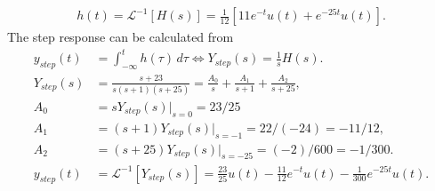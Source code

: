 \documentclass{report}
\begin{document}
\begin{solution}
\begin{align*}
        h(t) = \mathcal{L}^{-1}[H(s)] = \frac{1}{12}\left[11e^{-t}u(t) + e^{-25t}u(t)\right].
    \end{align*}
    The step response can be calculated from 
    \begin{align*}
        y_{step}(t) &= \int_{-\infty}^{t} h(\tau) \,d\tau \iff Y_{step}(s) = \frac{1}{s}H(s). \\[0.5cm]
        Y_{step}(s) &= \frac{s+23}{s(s+1)(s+25)} = \frac{A_0}{s} + \frac{A_1}{s+1} + \frac{A_2}{s+25}, \\
        A_0 &= sY_{step}(s)\big|_{s=0} = 23/25 \\
        A_1 &= (s+1)Y_{step}(s)\big|_{s=-1} = 22/(-24) = -11/12, \\
        A_2 &= (s+25)Y_{step}(s)\big|_{s=-25} = (-2)/600 = -1/300. \\[0.5cm]
        y_{step}(t) &= \mathcal{L}^{-1}[Y_{step}(s)] = \frac{23}{25}u(t) - \frac{11}{12}e^{-t}u(t) - \frac{1}{300}e^{-25t}u(t).
    \end{align*}
\end{solution}
\end{document}
